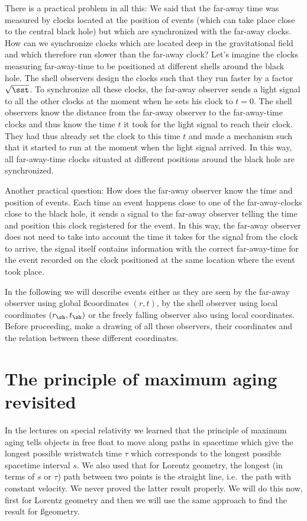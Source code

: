 {\begin{multicols}{2}
There is a practical problem in all this: We said that the far-away time was measured by clocks located at the position of events (which can take place close to the central black hole) but which are synchronized with the far-away clocks. How can we synchronize clocks which are located deep in the gravitational field and which therefore run slower than the far-away clock? Let's imagine the clocks measuring far-away-time to be positioned at different shells around the black hole. The shell observers design the clocks such that they run faster by a factor $\sqrt{\sst}$. To synchronize all these clocks, the far-away observer sends a light signal to all the other clocks at the moment when he sets his clock to $t=0$. The shell observers know the distance from the far-away observer to the far-away-time clocks and thus know the time $t$ it took for the light signal to reach their clock. They had thus already set the clock to this time $t$ and made a mechanism such that it started to run at the moment when the light signal arrived. In this way, all far-away-time clocks situated at different positions around the black hole are synchronized. 

Another practical question: How does the far-away observer know the time and position of events. Each time an event happens close to one of the far-away-clocks close to the black hole, it sends a signal to the far-away observer telling the time and position this clock registered for the event. In this way, the far-away observer does not need to take into account the time it takes for the signal from the clock to arrive, the signal itself contains information with the correct far-away-time for the event recorded on the clock positioned at the same location where the event took place.


In the following we will describe events either as they are seen by the far-away observer using global \ss coordinates $(r,t)$, by the shell observer using local coordinates $(r_\sh,t_\sh)$ or the freely falling observer also using local coordinates. Before proceeding, make a drawing of all these observers, their coordinates and the relation between these different coordinates.

\section{The principle of maximum aging revisited}
\label{sect:maxaging}

In the lectures on special relativity we learned that the principle of maximum aging tells objects in free float to move along paths in spacetime which give the longest possible wristwatch time $\tau$ which corresponds to the longest possible spacetime interval $s$. We also used that for Lorentz geometry, the longest (in terms of $s$ or $\tau$) path between two points is the straight line, i.e.\ the path with constant velocity. We never proved the latter result properly. We will do this now, first for Lorentz geometry and then we will use the same approach to find the result for \ss geometry.


\end{multicols}}
